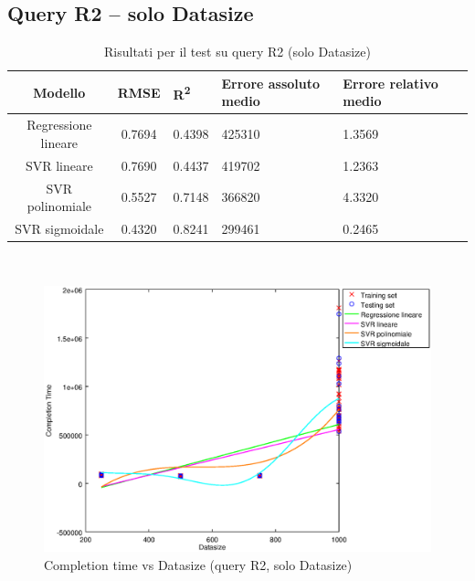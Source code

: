 \documentclass[a4paper,11pt]{article}
\begin{document}
\newpage
\subsection{Query R2 -- solo Datasize}
\begin{table}[bhpt]
	\centering
	\begin{adjustbox}{center}
		\begin{tabular}{c | c M{1.2cm} M{2.5cm} M{2.5cm} M{1.8cm}}
			Modello & RMSE & R\textsuperscript{2} & Errore assoluto medio & Errore relativo medio \tabularnewline
			\hline
			Regressione lineare & 0.7694 & 0.4398 & 425310 & 1.3569 \\
			SVR lineare & 0.7690 & 0.4437 & 419702 & 1.2363 \\
			SVR polinomiale & 0.5527 & 0.7148 & 366820 & 4.3320 \\
			SVR sigmoidale & 0.4320 & 0.8241 & 299461 & 0.2465 \\
		\end{tabular}
	\end{adjustbox}
	\\
	\caption{Risultati per il test su query R2 (solo Datasize)}
	\label{table_R2_datasize}
\end{table}

\begin {figure}[hbtp]
\centering
\includegraphics[width=\textwidth]{output/R2_SOLO_DATASIZE/plot_R2.eps}
\caption {Completion time vs Datasize (query R2, solo Datasize)}
\end {figure}

\newpage
\end{document}
